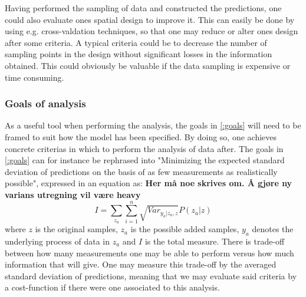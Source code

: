 Having performed the sampling of data and constructed the predictions, one could also evaluate ones spatial design to improve it. This can easily be done by using e.g. cross-valdation techniques, so that one may reduce or alter ones design after some criteria. A typical criteria could be to decrease the number of sampling points in the design without significant losses in the information obtained. This could obviously be valuable if the data sampling is expensive or time consuming.  

\subsubsection{Goals of analysis}
As a useful tool when performing the analysis, the goals in \ref{:goals} will need to be framed to suit how the model has been specified. By doing so, one achieves concrete criterias in which to perform the analysis of data after. The goals in \ref{:goals} can for instance be rephrased into "Minimizing the expected standard deviation of predictions on the basis of as few measurements as realistically possible", expressed in an equation as:
\textbf{Her må noe skrives om. Å gjøre ny varians utregning vil være heavy}
\begin{equation}
I = \sum_{z_a} \sum_{i=1}^n \sqrt{ Var_{y_a | z_a, z} } P(z_a | z) 
\end{equation}
where $z$ is the original samples, $z_a$ is the possible added samples, $y_a$ denotes the underlying process of data in $z_a$ and $I$ is the total measure. There is trade-off between how many measurements one may be able to perform versus how much information that will give. One may measure this trade-off by the averaged standard deviation of predictions, meaning that we may evaluate said criteria by a cost-function if there were one associated to this analysis. 
